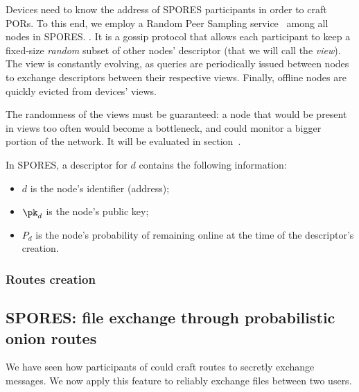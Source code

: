 Devices need to know the address of SPORES participants in order to craft PORs.
To this end, we employ a Random Peer Sampling service~\cite{Jelasity_Voulgaris_Guerraoui_Kermarrec_van_Steen_2007} among all nodes in SPORES. .
It is a gossip protocol that allows each participant to keep a fixed-size \emph{random} subset of other nodes' descriptor (that we will call the \emph{view}). 
The view is constantly evolving, as queries are periodically issued between nodes to exchange descriptors between their respective views.
Finally, offline nodes are quickly evicted from devices' views.

The randomness of the views must be guaranteed: 
a node that would be present in views too often would become a bottleneck, and could monitor a bigger portion of the network.
It will be evaluated in section~.

In SPORES, a descriptor for $d$ contains the following information:
\begin{itemize}
  \item \(d\) is the node's identifier (address);
  \item \(\pk_d\) is the node's public key;
  \item \(P_d\) is the node's probability of remaining online at the time of the descriptor's creation.
\end{itemize}


\subsubsection{Routes creation}
\label{sssec:routes_creation}



\subsection{SPORES: file exchange through probabilistic onion routes}
\label{ssec:spores_file_exchange_through_probabilistic_onion_routes}

\newcommand\finfo{\ensuremath{\mathcal{I}_f}}
\newcommand\filesize{\ensuremath{s_f}\xspace}
\newcommand\chunksize{\ensuremath{s_{\text{chunk}}}\xspace}
\newcommand\nchunks{\ensuremath{n_{\text{chunks}}}\xspace}
\newcommand\hashchunk{\ensuremath{\mathcal{H}_{\text{chunk}}}\xspace}
\newcommand\hashfile{\ensuremath{\mathcal{H}}\xspace}

We have seen how participants of \name could craft routes to secretly exchange messages.
We now apply this feature to reliably exchange files between two users.

